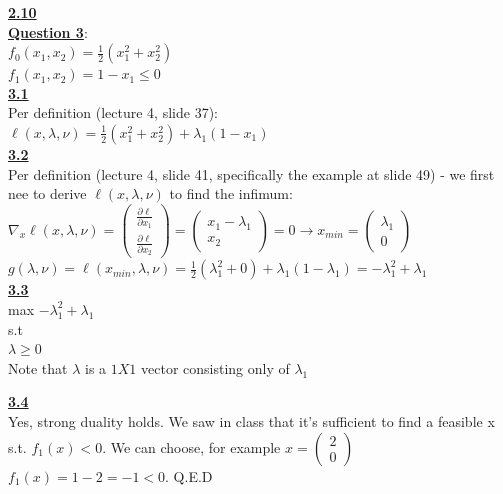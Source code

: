 \documentclass[fleqn]{article}
\begin{document}
\underline{\textbf{2.10}} \\

\clearpage\underline{\textbf{Question 3}}:\\

$f_0(x_1,x_2)  =\frac{1}{2}(x_1^2+x_2^2)$ \\

$f_1(x_1,x_2) = 1-x_1 \leq 0$ \\

\underline{\textbf{3.1}} \\
Per definition (lecture 4, slide 37): \\
$\ell(x, \lambda, \nu) = \frac{1}{2}(x_1^2+x_2^2) + \lambda_1(1-x_1)$ \\

\underline{\textbf{3.2}} \\
Per definition (lecture 4, slide 41, specifically the example at slide 49) - we first nee to derive $\ell(x, \lambda, \nu)$ to find the infimum: \\

$\nabla_x \ell(x, \lambda, \nu) =     \begin{pmatrix}
           \frac{\partial \ell}{\partial x_1} \\
            \frac{\partial \ell}{\partial x_2} 
         \end{pmatrix} = 
  \begin{pmatrix}
           x_1 - \lambda_1 \\
            x_2 
         \end{pmatrix} = 0 \rightarrow x_{min} = 
  \begin{pmatrix}
           \lambda_1 \\
            0 
         \end{pmatrix}$ \\

$g(\lambda, \nu) = \ell(x_{min}, \lambda, \nu) =  
\frac{1}{2}(\lambda_1^2+0) + \lambda_1(1-\lambda_1)=
-\lambda_1^2 + \lambda_1
$ \\

\underline{\textbf{3.3}} \\
max $-\lambda_1^2 + \lambda_1$\\s.t\\
$\lambda \geq0$ \\

Note that $\lambda$ is a $1X1$ vector consisting only of $\lambda_1$ 

\underline{\textbf{3.4}} \\
Yes, strong duality holds. We saw in class that it's sufficient to find a feasible x s.t. $f_1(x)<0$. We can choose, for example $x =   \begin{pmatrix}
            2 \\
            0 
         \end{pmatrix}$
$f_1(x) = 1-2=-1<0$.
Q.E.D
\end{document}
